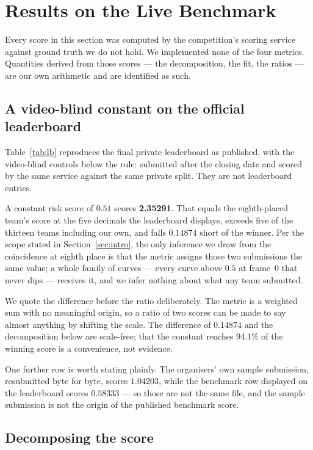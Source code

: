 \section{Results on the Live Benchmark}
\label{sec:leaderboard}

Every score in this section was computed by the competition's scoring service
against ground truth we do not hold. We implemented none of the four metrics.
Quantities derived from those scores --- the decomposition, the fit, the ratios
--- are our own arithmetic and are identified as such.

\subsection{A video-blind constant on the official leaderboard}

Table~\ref{tab:lb} reproduces the final private leaderboard as published, with
the video-blind controls below the rule: submitted after the closing date and
scored by the same service against the same private split. They are not
leaderboard entries.

A constant risk score of $0.51$ scores \textbf{2.35291}. That equals the
eighth-placed team's score at the five decimals the leaderboard displays,
exceeds five of the thirteen teams including our own, and falls $0.14874$ short
of the winner. Per the scope stated in Section~\ref{sec:intro}, the only
inference we draw from the coincidence at eighth place is that the metric
assigns those two submissions the same value; a whole family of curves --- every
curve above $0.5$ at frame~0 that never dips --- receives it, and we infer
nothing about what any team submitted.

We quote the difference before the ratio deliberately. The metric is a weighted
sum with no meaningful origin, so a ratio of two scores can be made to say
almost anything by shifting the scale. The difference of $0.14874$ and the
decomposition below are scale-free; that the constant reaches 94.1\% of the
winning score is a convenience, not evidence.

One further row is worth stating plainly. The organisers' own sample
submission, resubmitted byte for byte, scores $1.04203$, while the benchmark row
displayed on the leaderboard scores $0.58333$ --- so those are not the same
file, and the sample submission is not the origin of the published benchmark
score.

\subsection{Decomposing the score}

